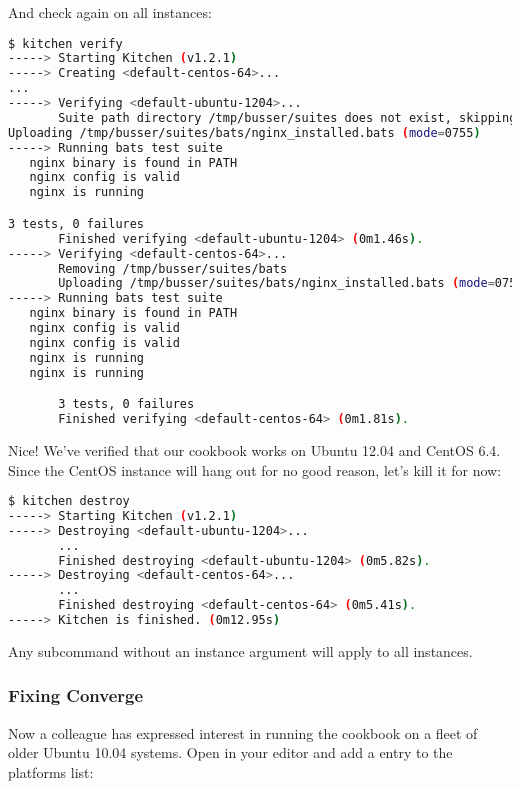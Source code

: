 And check again on all instances:

\begin{lstlisting}[language=Bash,label=lst:testing-test-kitchen24]
$ kitchen verify
-----> Starting Kitchen (v1.2.1)
-----> Creating <default-centos-64>...
...
-----> Verifying <default-ubuntu-1204>...
       Suite path directory /tmp/busser/suites does not exist, skipping.
Uploading /tmp/busser/suites/bats/nginx_installed.bats (mode=0755)
-----> Running bats test suite
   nginx binary is found in PATH
   nginx config is valid
   nginx is running

3 tests, 0 failures
       Finished verifying <default-ubuntu-1204> (0m1.46s).
-----> Verifying <default-centos-64>...
       Removing /tmp/busser/suites/bats
       Uploading /tmp/busser/suites/bats/nginx_installed.bats (mode=0755)
-----> Running bats test suite
   nginx binary is found in PATH
   nginx config is valid                                                    2/3
   nginx config is valid
   nginx is running                                                         3/3
   nginx is running

       3 tests, 0 failures
       Finished verifying <default-centos-64> (0m1.81s).
\end{lstlisting}

Nice! We've verified that our cookbook works on Ubuntu 12.04 and CentOS 6.4. Since the CentOS instance will hang out for no good reason, let's kill it for now:

\begin{lstlisting}[language=Bash,label=lst:testing-test-kitchen25]
$ kitchen destroy
-----> Starting Kitchen (v1.2.1)
-----> Destroying <default-ubuntu-1204>...
       ...
       Finished destroying <default-ubuntu-1204> (0m5.82s).
-----> Destroying <default-centos-64>...
       ...
       Finished destroying <default-centos-64> (0m5.41s).
-----> Kitchen is finished. (0m12.95s)
\end{lstlisting}

Any  subcommand without an instance argument will apply to all instances.



\subsubsection{Fixing Converge}

Now a colleague has expressed interest in running the cookbook on a fleet of older Ubuntu 10.04 systems. Open  in your editor and add a  entry to the platforms list:

